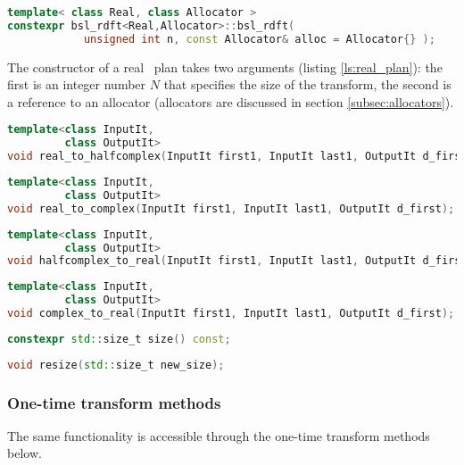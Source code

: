 \begin{lstlisting}[language=C++,caption=Real plan constructor.,label=ls:real_plan]
template< class Real, class Allocator >
constexpr bsl_rdft<Real,Allocator>::bsl_rdft(
            unsigned int n, const Allocator& alloc = Allocator{} );
\end{lstlisting}
The constructor of a real \dft\ plan takes two arguments (listing
\ref{ls:real_plan}): the first is an integer number $N$ that specifies the size of
the transform, the second is a
reference to an allocator (allocators are discussed in section
\ref{subsec:allocators}).
\begin{lstlisting}[language=C++,caption=Real to halfcomplex.]
template<class InputIt,
         class OutputIt>
void real_to_halfcomplex(InputIt first1, InputIt last1, OutputIt d_first);
\end{lstlisting}
\begin{lstlisting}[language=C++,caption=Real to complex.]
template<class InputIt,
         class OutputIt>
void real_to_complex(InputIt first1, InputIt last1, OutputIt d_first);
\end{lstlisting}
\begin{lstlisting}[language=C++,caption=Halfcomplex to real.]
template<class InputIt,
         class OutputIt>
void halfcomplex_to_real(InputIt first1, InputIt last1, OutputIt d_first);
\end{lstlisting}
\begin{lstlisting}[language=C++,caption=Complex to real.]
template<class InputIt,
         class OutputIt>
void complex_to_real(InputIt first1, InputIt last1, OutputIt d_first);
\end{lstlisting}
\begin{lstlisting}[language=C++,caption=Size.]
constexpr std::size_t size() const;
\end{lstlisting}
\begin{lstlisting}[language=C++,caption=Resize.]
void resize(std::size_t new_size);
\end{lstlisting}

\subsubsection*{One-time transform methods}
The same functionality is accessible through the one-time transform methods
below.


